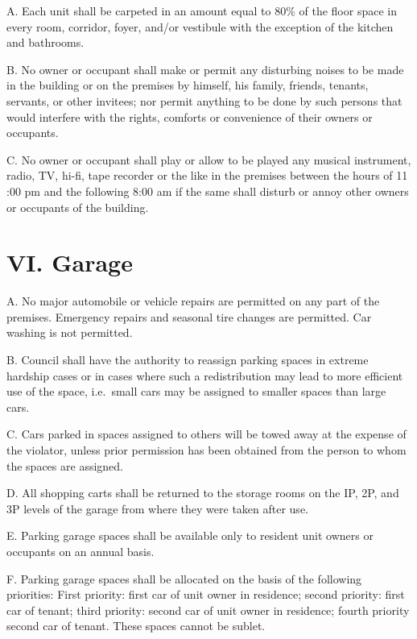 \documentclass[
]{book}
\begin{document}
A. Each unit shall be carpeted in an amount equal to 80\% of the floor space in every room, corridor, foyer, and/or vestibule with the exception of the kitchen and bathrooms.

B. No owner or occupant shall make or permit any disturbing noises to be made in the building or on the premises by himself, his family, friends, tenants, servants, or other invitees; nor permit anything to be done by such persons that would interfere with the rights, comforts or convenience of their owners or occupants.

C. No owner or occupant shall play or allow to be played any musical instrument, radio, TV, hi-fi, tape recorder or the like in the premises between the hours of 11 :00 pm and the following 8:00 am if the same shall disturb or annoy other owners or occupants of the building.

\hypertarget{vi.-garage}{%
\section*{VI. Garage}\label{vi.-garage}}

A. No major automobile or vehicle repairs are permitted on any part of the premises. Emergency repairs and seasonal tire changes are permitted. Car washing is not permitted.

B. Council shall have the authority to reassign parking spaces in extreme hardship cases or in cases where such a redistribution may lead to more efficient use of the space, i.e.~small cars may be assigned to smaller spaces than large cars.

C. Cars parked in spaces assigned to others will be towed away at the expense of the violator, unless prior permission has been obtained from the person to whom the spaces are assigned.

D. All shopping carts shall be returned to the storage rooms on the IP, 2P, and 3P levels of the garage from where they were taken after use.

E. Parking garage spaces shall be available only to resident unit owners or occupants on an annual basis.

F. Parking garage spaces shall be allocated on the basis of the following priorities: First priority: first car of unit owner in residence; second priority: first car of tenant; third priority: second car of unit owner in residence; fourth priority second car of tenant. These spaces cannot be sublet.
\end{document}

